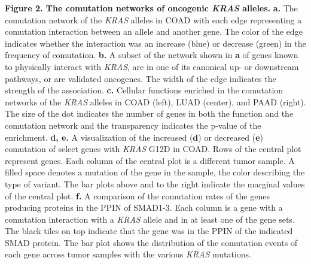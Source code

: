 \documentclass[english, 10pt, letterpaper]{article}
\newcommand{\KRAS}{\emph{KRAS}}
\begin{document}
\newpage
\noindent \textbf{Figure 2. The comutation networks of oncogenic \KRAS{} alleles.}
\textbf{a.} The comutation network of the \KRAS{} alleles in COAD with each edge representing a comutation interaction between an allele and another gene. The color of the edge indicates whether the interaction was an increase (blue) or decrease (green) in the frequency of comutation.
\textbf{b.} A subset of the network shown in \textbf{a} of genes known to physically interact with \KRAS{}, are in one of its canonical up- or downstream pathways, or are validated oncogenes. The width of the edge indicates the strength of the association.
\textbf{c.} Cellular functions enriched in the comutation networks of the \KRAS{} alleles in COAD (left), LUAD (center), and PAAD (right). The size of the dot indicates the number of genes in both the function and the comutation network and the transparency indicates the p-value of the enrichment.
\textbf{d, e.} A visualization of the increased (\textbf{d}) or decreased (\textbf{e}) comutation of select genes with \KRAS{} G12D in COAD. Rows of the central plot represent genes. Each column of the central plot is a different tumor sample. A filled space denotes a mutation of the gene in the sample, the color describing the type of variant. The bar plots above and to the right indicate the marginal values of the central plot.
\textbf{f.} A comparison of the comutation rates of the genes producing proteins in the PPIN of SMAD1-3. Each column is a gene with a comutation interaction with a \KRAS{} allele and in at least one of the gene sets. The black tiles on top indicate that the gene was in the PPIN of the indicated SMAD protein. The bar plot shows the distribution of the comutation events of each gene across tumor samples with the various \KRAS{} mutations.
\newpage
\end{document}
